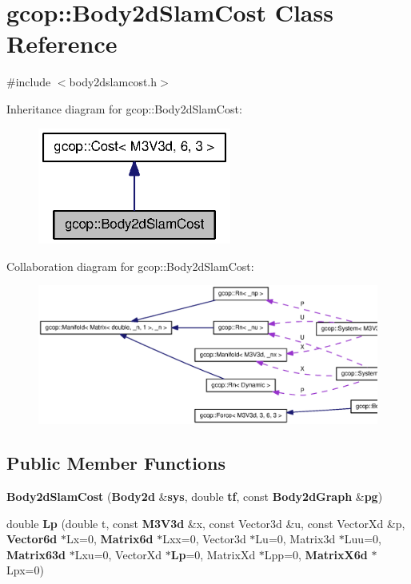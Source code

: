 \section{gcop\-:\-:\-Body2d\-Slam\-Cost \-Class \-Reference}
\label{classgcop_1_1Body2dSlamCost}


{\ttfamily \#include $<$body2dslamcost.\-h$>$}



\-Inheritance diagram for gcop\-:\-:\-Body2d\-Slam\-Cost\-:\nopagebreak
\begin{figure}[H]
\begin{center}
\leavevmode
\includegraphics[width=180pt]{classgcop_1_1Body2dSlamCost__inherit__graph}
\end{center}
\end{figure}


\-Collaboration diagram for gcop\-:\-:\-Body2d\-Slam\-Cost\-:\nopagebreak
\begin{figure}[H]
\begin{center}
\leavevmode
\includegraphics[width=350pt]{classgcop_1_1Body2dSlamCost__coll__graph}
\end{center}
\end{figure}
\subsection*{\-Public \-Member \-Functions}
\begin{DoxyCompactItemize}
\item 
{\bf \-Body2d\-Slam\-Cost} ({\bf \-Body2d} \&{\bf sys}, double {\bf tf}, const {\bf \-Body2d\-Graph} \&{\bf pg})
\item 
double {\bf \-Lp} (double t, const {\bf \-M3\-V3d} \&x, const \-Vector3d \&u, const \-Vector\-Xd \&p, {\bf \-Vector6d} $\ast$\-Lx=0, {\bf \-Matrix6d} $\ast$\-Lxx=0, \-Vector3d $\ast$\-Lu=0, \-Matrix3d $\ast$\-Luu=0, {\bf \-Matrix63d} $\ast$\-Lxu=0, \-Vector\-Xd $\ast${\bf \-Lp}=0, \-Matrix\-Xd $\ast$\-Lpp=0, {\bf \-Matrix\-X6d} $\ast$\-Lpx=0)
\end{DoxyCompactItemize}
